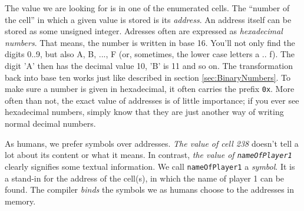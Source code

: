 The value we are looking for is in one of the enumerated cells. The \enquote{number of the cell} in which a given value is stored is its \emph{address}. An address itself can be stored as some unsigned integer. Adresses often are expressed as \emph{hexadecimal numbers}. That means, the number is written in base 16. You'll not only find the digits 0..9, but also A, B, ..., F (or, sometimes, the lower case letters a .. f). The digit 'A' then has the decimal value 10, 'B' is 11 and so on. The transformation back into base ten works just like described in section \ref{sec:BinaryNumbers}. To make sure a number is given in hexadecimal, it often carries the prefix \texttt{0x}. More often than not, the exact value of addresses is of little importance; if you ever see hexadecimal numbers, simply know that they are just another way of writing normal decimal numbers.

As humans, we prefer symbols over addresses. \emph{The value of cell 238} doesn't tell a lot about its content or what it means. In contrast, \emph{the value of \texttt{nameOfPlayer1}} clearly signifies some textual information. We call \texttt{nameOfPlayer1} a \emph{symbol}. It is a stand-in for the address of the cell(s), in which the name of player 1 can be found. The compiler \emph{binds} the symbols we as humans choose to the addresses in memory.

\begin{defbox}
\begin{center}
\end{center}
\end{defbox}

